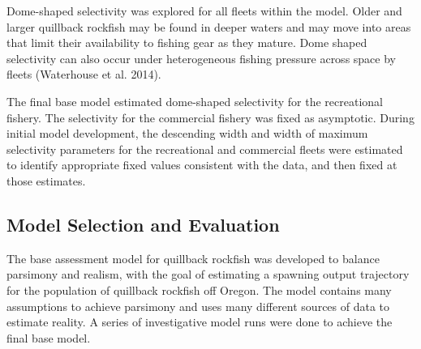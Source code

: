 \documentclass[11pt,
  english,
  a4paper,
]{article}
\begin{document}
\leavevmode\tagmcend\tagstructend\par


Dome-shaped selectivity was explored for all fleets within the model. Older and larger quillback rockfish may be found in deeper waters and may move into areas that limit their availability to fishing gear as they mature. Dome shaped selectivity can also occur under heterogeneous fishing pressure across space by fleets {(Waterhouse et al. 2014)\leavevmode\tagmcend\tagstructend}.

\leavevmode\tagmcend\tagstructend\par


The final base model estimated dome-shaped selectivity for the recreational fishery. The selectivity for the commercial fishery was fixed as asymptotic. During initial model development, the descending width and width of maximum selectivity parameters for the recreational and commercial fleets were estimated to identify appropriate fixed values consistent with the data, and then fixed at those estimates.

\leavevmode\tagmcend\tagstructend\par


\hypertarget{model-selection-and-evaluation}{%
\subsection{Model Selection and Evaluation}\label{model-selection-and-evaluation}}

\leavevmode\tagmcend\tagstructend


The base assessment model for quillback rockfish was developed to balance parsimony and realism, with the goal of estimating a spawning output trajectory for the population of quillback rockfish off Oregon. The model contains many assumptions to achieve parsimony and uses many different sources of data to estimate reality. A series of investigative model runs were done to achieve the final base model.

\leavevmode\tagmcend\tagstructend\par

\end{document}
